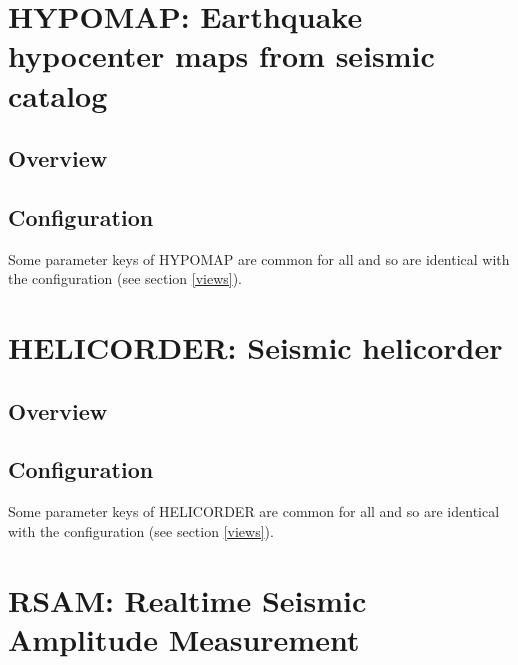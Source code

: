 \section{HYPOMAP: Earthquake hypocenter maps from seismic catalog}

\subsection{Overview}

\subsection{Configuration}

Some parameter keys of HYPOMAP are common for all  and  so are identical with the  configuration (see section \ref{views}).




\section{HELICORDER: Seismic helicorder}

\subsection{Overview}

\subsection{Configuration}

Some parameter keys of HELICORDER are common for all  and  so are identical with the  configuration (see section \ref{views}).




\section{RSAM: Realtime Seismic Amplitude Measurement}

